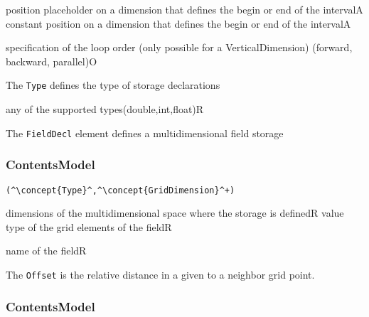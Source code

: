 \begin{HIRChildElements}
	{position placeholder on a dimension that defines the begin or end of the interval}{A}
	{constant position on a dimension that defines the begin or end of the interval}{A}
\end{HIRChildElements}

\begin{HIRAttributesVal}
	{specification of the loop order (only possible for a VerticalDimension) }{(forward, backward, parallel)}{O}
\end{HIRAttributesVal}


The {\tt Type} defines the type of storage declarations
\HIRContentsModel{ () }

\begin{HIRAttributesVal}
	{any of the supported types}{(double,int,float)}{R}
\end{HIRAttributesVal}

The {\tt FieldDecl} element defines a multidimensional field storage
\subsubsection*{ContentsModel}{}

\begin{lstlisting}[style=default,frame=none]
(^\concept{Type}^,^\concept{GridDimension}^+)
\end{lstlisting}

\begin{HIRChildElements}
	{dimensions of the multidimensional space where the storage is defined}{R}
	{value type of the grid elements of the field}{R}
\end{HIRChildElements}

\begin{HIRAttributes}
	{name of the field}{R}
\end{HIRAttributes}


The {\tt Offset} is the relative distance in a given  to a neighbor grid point.

\subsubsection*{ContentsModel}{}

